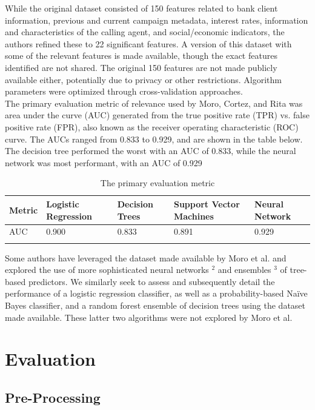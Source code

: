 \documentclass[11pt]{article}
\begin{document}
While the original dataset consisted of 150 features related to bank client information, previous and current campaign metadata, interest rates, information and characteristics of the calling agent, and social/economic indicators, the authors refined these to 22 significant features. A version of this dataset with some of the relevant features is made available, though the exact features identified are not shared. The original 150 features are not made publicly available either, potentially due to privacy or other restrictions. Algorithm parameters were optimized through cross-validation approaches. \\

The primary evaluation metric of relevance used by Moro, Cortez, and Rita was area under the curve (AUC) generated from the true positive rate (TPR) vs. false positive rate (FPR), also known as the receiver operating characteristic (ROC) curve.  The AUCs ranged from 0.833 to 0.929, and are shown in the table below. The decision tree performed the worst with an AUC of 0.833, while the neural network was most performant, with an AUC of 0.929 

\begin{table}[h]
\centering
\caption{The primary evaluation metric}
\begin{tabular}{lllll}
\hline
\textbf{Metric}& \textbf{Logistic Regression}& \textbf{Decision Trees}& \textbf{Support Vector Machines}& \textbf{Neural Network}\\
\hline
AUC&0.900 &0.833&0.891&0.929\\
\hline
\label{tB}
\end{tabular}
\end{table}

Some authors have leveraged the dataset made available by Moro et al. and explored the use of more sophisticated neural networks $^2$ and {ensembles} $^3$ of tree-based predictors. We similarly seek to assess and subsequently detail the performance of a logistic regression classifier, as well as a probability-based Naïve Bayes classifier, and a random forest ensemble of decision trees using the dataset made available. These latter two algorithms were not explored by Moro et al.\\

\section{Evaluation}
\label{S:3}

\subsection{Pre-Processing}
\label{SS:3-1}
\end{document}
